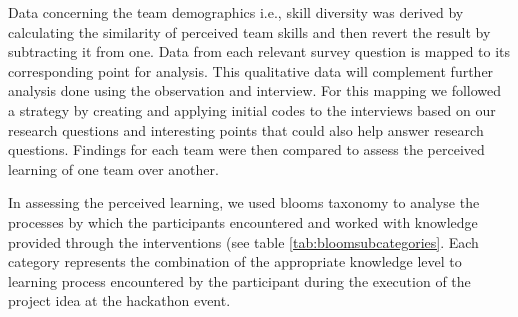\documentclass[runningheads]{llncs}
\begin{document}
Data concerning the team demographics i.e., skill diversity was derived by calculating the similarity of perceived team skills and then revert the result by subtracting it from one. %
Data from each relevant survey question is mapped to its corresponding point for analysis. This qualitative data will complement further analysis done using the observation and interview. For this mapping we followed a strategy \cite{braun2006using} by creating and applying initial codes to the interviews based on our research questions and interesting points that could also help answer research questions. Findings for each team were then compared to assess the perceived learning of one team over another.

In assessing the perceived learning, we used blooms taxonomy\cite{bloom1956taxonomy,krathwohl2009taxonomy} to analyse the processes by which the participants encountered and worked with knowledge provided through the interventions (see table \ref{tab:bloomsubcategories}. Each category represents the combination of the appropriate knowledge level to learning process encountered by the participant during the execution of the project idea at the hackathon event.
\end{document}
